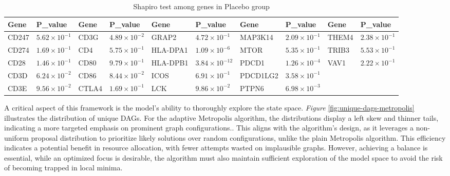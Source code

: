 \documentclass{report}
\begin{document}
	\begin{table}[!ht]
		\begin{adjustwidth}{-0.1\textwidth}{-0.07\textwidth}
		\centering
		\begin{tabular}{|l|l|l|l|l|l|l|l|l|l|}
			\hline
			\textbf{Gene} & \textbf{P\_value} & \textbf{Gene} & \textbf{P\_value} & \textbf{Gene} & \textbf{P\_value} & \textbf{Gene} & \textbf{P\_value} & \textbf{Gene} & \textbf{P\_value} \\ \hline
			CD247 & \(5.62 \times 10^{-1}\) & CD3G & \(4.89 \times 10^{-2}\) & GRAP2 & \(4.72 \times 10^{-1}\) & MAP3K14 & \(2.09 \times 10^{-1}\) & THEM4 & \(2.38 \times 10^{-1}\) \\ \hline
			CD274 & \(1.69 \times 10^{-1}\) & CD4 & \(5.75 \times 10^{-1}\) & HLA-DPA1 & \(1.09 \times 10^{-6}\) & MTOR & \(5.35 \times 10^{-1}\) & TRIB3 & \(5.53 \times 10^{-1}\) \\ \hline
			CD28 & \(1.46 \times 10^{-1}\) & CD80 & \(9.79 \times 10^{-1}\) & HLA-DPB1 & \(3.84 \times 10^{-12}\) & PDCD1 & \(1.26 \times 10^{-4}\) & VAV1 & \(2.22 \times 10^{-1}\) \\ \hline
			CD3D & \(6.24 \times 10^{-2}\) & CD86 & \(8.44 \times 10^{-2}\) & ICOS & \(6.91 \times 10^{-1}\) & PDCD1LG2 & \(3.58 \times 10^{-1}\) & ~ & ~ \\ \hline
			CD3E & \(9.56 \times 10^{-2}\) & CTLA4 & \(1.69 \times 10^{-1}\) & LCK & \(9.86 \times 10^{-2}\) & PTPN6 & \(6.98 \times 10^{-3}\) & ~ & ~ \\ \hline
		\end{tabular}
		\caption{Shapiro test among genes in Placebo group}
		\label{tab:shapiro-placebo}
		\end{adjustwidth}
	\end{table}		
	
	A critical aspect of this framework is the model’s ability to thoroughly explore the state space. \textit{Figure} \ref{fig:unique-dags-metropolis} illustrates the distribution of unique DAGs. For the adaptive Metropolis algorithm, the distributions display a left skew and thinner tails, indicating a more targeted emphasis on prominent graph configurations.. This aligns with the algorithm’s design, as it leverages a non-uniform proposal distribution to prioritize likely solutions over random configurations, unlike the plain Metropolis algorithm. This efficiency indicates a potential benefit in resource allocation, with fewer attempts wasted on implausible graphs. However, achieving a balance is essential, while an optimized focus is desirable, the algorithm must also maintain sufficient exploration of the model space to avoid the risk of becoming trapped in local minima.
	
\end{document}
